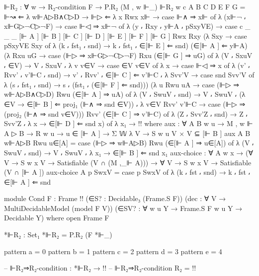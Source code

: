 \begin{spverbatim}
  ⊩R₂ : ∀ {w} → R₂-condition F → P.R₂ (M , w ⊩_)
  ⊩R₂ {w} c {A} {B} {C} {D} {E} {F} {G} = ⊩↝ ⇐ λ {w⊩A▷B∧C▷D → ⊩▷ ⇐
    λ { {x} Rwx x⊩ → case ⊩∧ ⇒ x⊩ of
    λ { (x⊩¬ ⸴ x⊩G▷¬C▷¬F) → case ⊩◁ ⇒ x⊩¬ of
    λ { (y ⸴ Rxy ⸴ y⊩A ⸴ pSxyVE) →
    case c {_} {_} {_} {[⊩ A ]} {[⊩ B ]} {[⊩ C ]} {[⊩ D ]} {[⊩ E ]} {[⊩ F ]} {[⊩ G ]}
    Rwx Rxy (λ {Sxy → case pSxyVE Sxy of λ { (k ⸴ fst₁ ⸴ snd) → k ⸴ fst₁ ⸴ ∈[⊩ E ] ⇐ snd}})
    (∈[⊩ A ] ⇐ y⊩A) (λ {Rxu uG → case (⊩▷ ⇒ x⊩G▷¬C▷¬F) Rxu (∈[⊩ G ] ⇒ uG) of
    λ { (V ⸴ SxuV ⸴ ∈V) → V ⸴ SxuV ⸴ λ { {v} v∈V → case ∈V v∈V of
    λ {x → case ⊩◁ ⇒ x of λ { (v' ⸴ Rvv' ⸴ v'⊩C ⸴ snd) → v' ⸴ Rvv' ⸴ ∈[⊩ C ] ⇐ v'⊩C ⸴
    λ {Svv'V → case snd Svv'V of λ { (s ⸴ fst₁ ⸴ snd) → s ⸴ (fst₁ ⸴ (∈[⊩ F ] ⇐ snd))}}}}}}})
    (λ { {u} Rwu uA → case (⊩▷ ⇒ w⊩A▷B∧C▷D) Rwu (∈[⊩ A ] ⇒ uA) of
    λ { (V ⸴ SwuV ⸴ snd) → V ⸴ SwuV ⸴ (λ {∈V → ∈[⊩ B ] ⇐ proj₁ (⊩∧ ⇒ snd ∈V)}) ⸴
    λ { v∈V Rvv' v'⊩C → case (⊩▷ ⇒ (proj₂ (⊩∧ ⇒ snd v∈V))) Rvv' (∈[⊩ C ] ⇒ v'⊩C) of
    λ { (Z ⸴ Svv'Z ⸴ snd) → Z ⸴ Svv'Z ⸴ λ {x → ∈[⊩ D ] ⇐ snd x}}}}}) of
    λ {x₁ → {!!}}}}}}
    where
    aux : ∀ {A B w u} → M , w ⊩ A ▷ B → R w u → u ∈ [⊩ A ] → Σ 𝕎 λ V → S w u V × V ⊆ [⊩ B ]
    aux {A} {B} w⊩A▷B Rwu u∈[A] = case (⊩▷ ⇒ w⊩A▷B) Rwu (∈[⊩ A ] ⇒ u∈[A]) of
      λ { (V ⸴ SwuV ⸴ snd) → V ⸴ SwuV ⸴ λ {x₁ → ∈[⊩ B ] ⇐ snd x₁}}
    aux-choice : ∀ {A w x} → (∀ {V} → S w x V → Satisfiable (V ∩ (M ,_⊩ A))) → ∀ {V} → S w x V → Satisfiable (V ∩ [⊩ A ])
    aux-choice {A} p SwxV = case p SwxV of λ { (k ⸴ fst ⸴ snd) → k ⸴ fst ⸴ ∈[⊩ A ] ⇐ snd }


module Cond {F : Frame {{!!}}}
  (∈S? : Decidable₃ (Frame.S F))
  (dec : ∀ V → MultiDecidableModel (model F V))
  (∈SV? : ∀ {w u Y} → Frame.S F w u Y → Decidable Y)
  where
  open Frame F

  *⊩R₂ : Set₁
  *⊩R₂ = P.R₂ (F *⊩_)

  pattern a = 0
  pattern b = 1
  pattern c = 2
  pattern d = 3
  pattern e = 4

  -- ⊩R₂⇒R₂-condition : *⊩R₂ → {!!}
  -- ⊩R₂⇒R₂-condition R₂ = {!!}
\end{spverbatim}
